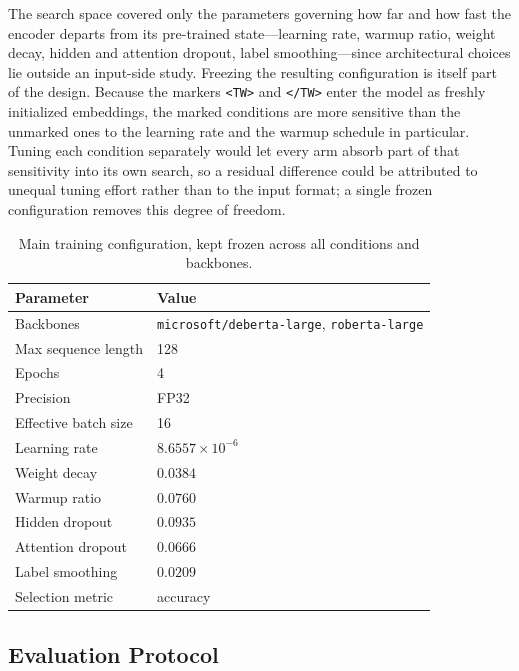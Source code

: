 \documentclass[runningheads]{llncs}
\begin{document}
The search space covered only the parameters governing how far and how fast the
encoder departs from its pre-trained state---learning rate, warmup ratio, weight
decay, hidden and attention dropout, label smoothing---since architectural
choices lie outside an input-side study. Freezing the resulting configuration is
itself part of the design. Because the markers \texttt{<TW>} and \texttt{</TW>}
enter the model as freshly initialized embeddings, the marked conditions are
more sensitive than the unmarked ones to the learning rate and the warmup
schedule in particular. Tuning each condition separately would let every arm
absorb part of that sensitivity into its own search, so a residual difference
could be attributed to unequal tuning effort rather than to the input format; a
single frozen configuration removes this degree of freedom.

\begin{table}[t]
\centering
\caption{Main training configuration, kept frozen across all conditions and
backbones.}
\label{tab:hparams}
\footnotesize
\begin{tabular}{ll}
\toprule
Parameter & Value\\
\midrule
Backbones & \texttt{microsoft/deberta-large}, \texttt{roberta-large}\\
Max sequence length & 128\\
Epochs & 4\\
Precision & FP32\\
Effective batch size & 16\\
Learning rate & $8.6557 \times 10^{-6}$\\
Weight decay & $0.0384$\\
Warmup ratio & $0.0760$\\
Hidden dropout & $0.0935$\\
Attention dropout & $0.0666$\\
Label smoothing & $0.0209$\\
Selection metric & accuracy\\
\bottomrule
\end{tabular}
\end{table}

\subsection{Evaluation Protocol}
\label{subsec:protocol}
\end{document}
